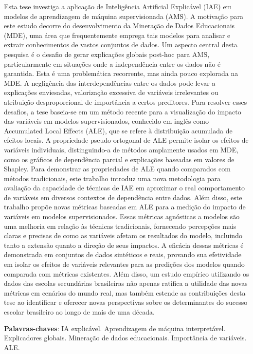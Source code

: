 
\begin{resumo}[Resumo] 
Esta tese investiga a aplicação de Inteligência Artificial Explicável (IAE) em modelos de aprendizagem de máquina supervisionada (AMS). A motivação para este estudo decorre do desenvolvimento da Mineração de Dados Educacionais (MDE), uma área que frequentemente emprega tais modelos para analisar e extrair conhecimentos de vastos conjuntos de dados. Um aspecto central desta pesquisa é o desafio de gerar explicações globais post-hoc para AMS, particularmente em situações onde a independência entre os dados não é garantida. Esta é uma problemática recorrente, mas ainda pouco explorada na MDE. A negligência das interdependências entre os dados pode levar a explicações enviesadas, valorização excessiva de variáveis irrelevantes ou atribuição desproporcional de importância a certos preditores. Para resolver esses desafios, a tese baseia-se em um método recente para a visualização do impacto das variáveis em modelos supervisionados, conhecido em inglês como Accumulated Local Effects (ALE), que se refere à distribuição acumulada de efeitos locais. A propriedade pseudo-ortogonal de ALE permite isolar os efeitos de variáveis individuais, distinguindo-a de métodos amplamente usados em MDE, como os gráficos de dependência parcial e explicações baseadas  em valores de Shapley. Para demonstrar as propriedades de ALE quando comparados com métodos tradicionais, este trabalho introduz uma nova metodologia para avaliação da capacidade de técnicas de IAE em aproximar o real comportamento de variáveis  em diversos contextos de dependência entre dados. Além disso, este trabalho propõe novas métricas baseadas em ALE para a medição do impacto de variáveis em modelos supervisionados. Essas métricas agnósticas a modelos são uma melhoria em relação às técnicas tradicionais, fornecendo percepções mais claras e precisas de como as variáveis afetam os resultados do modelo, incluindo tanto a extensão quanto a direção de seus impactos. A eficácia dessas métricas é demonstrada em conjuntos de dados sintéticos e reais, provando sua efetividade em isolar os efeitos de  variáveis relevantes para as predições dos modelos quando comparada com métricas existentes. Além disso, um estudo empírico utilizando os dados das escolas secundárias brasileiras não apenas ratifica a utilidade das novas métricas em cenários do mundo real, mas também estende as contribuições desta tese ao identificar e oferecer novas perspectivas sobre os determinantes do sucesso escolar brasileiro ao longo de mais de uma década.


 \vspace{\onelineskip}
    
 \noindent
 \textbf{Palavras-chaves}: IA explicável. Aprendizagem de máquina interpretável.  Explicadores globais. Mineração de dados educacionais. Importância de variáveis. ALE.
\end{resumo}

